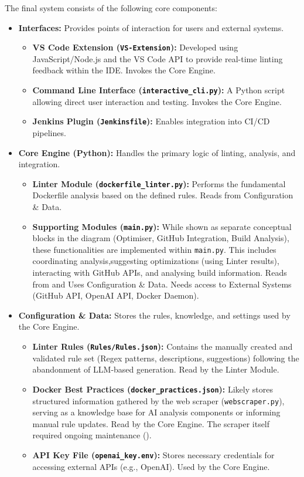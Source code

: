 The final system consists of the following core components:
\begin{itemize}
    \item \textbf{Interfaces:} Provides points of interaction for users and external systems.
        \begin{itemize}
            \item \textbf{VS Code Extension (\texttt{VS-Extension}):} Developed using JavaScript/Node.js and the VS Code API to provide real-time linting feedback within the IDE. Invokes the Core Engine.
            \item \textbf{Command Line Interface (\texttt{interactive\_cli.py}):} A Python script allowing direct user interaction and testing. Invokes the Core Engine.
            \item \textbf{Jenkins Plugin (\texttt{Jenkinsfile}):} Enables integration into CI/CD pipelines.
        \end{itemize}

    \item \textbf{Core Engine (Python):} Handles the primary logic of linting, analysis, and integration.
        \begin{itemize}
            \item \textbf{Linter Module (\texttt{dockerfile\_linter.py}):} Performs the fundamental Dockerfile analysis based on the defined rules. Reads from Configuration \& Data.
            \item \textbf{Supporting Modules (\texttt{main.py}):} While shown as separate conceptual blocks in the diagram (Optimiser, GitHub Integration, Build Analysis), these functionalities are implemented within \texttt{main.py}. This includes coordinating analysis,suggesting optimizations (using Linter results), interacting with GitHub APIs, and analysing build information. Reads from and Uses Configuration \& Data. Needs access to External Systems (GitHub API, OpenAI API, Docker Daemon).
        \end{itemize}

    \item \textbf{Configuration \& Data:} Stores the rules, knowledge, and settings used by the Core Engine.
        \begin{itemize}
            \item \textbf{Linter Rules (\texttt{Rules/Rules.json}):} Contains the manually created and validated rule set (Regex patterns, descriptions, suggestions) following the abandonment of LLM-based generation. Read by the Linter Module.
            \item \textbf{Docker Best Practices (\texttt{docker\_practices.json}):} Likely stores structured information gathered by the web scraper (\texttt{webscraper.py}), serving as a knowledge base for AI analysis components or informing manual rule updates. Read by the Core Engine. The scraper itself required ongoing maintenance ().
            \item \textbf{API Key File (\texttt{openai\_key.env}):} Stores necessary credentials for accessing external APIs (e.g., OpenAI). Used by the Core Engine.
        \end{itemize}


\end{itemize}

